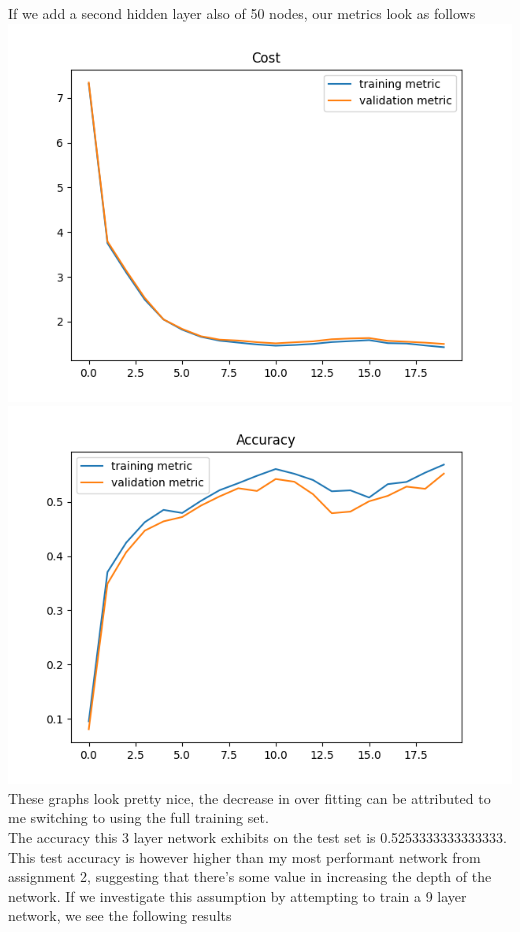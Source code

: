 \documentclass[11pt,a4paper]{article}
\begin{document}
If we add a second hidden layer also of 50 nodes, our metrics look as follows\\
\includegraphics[width=\textwidth]{cost_k=2.png}
\includegraphics[width=\textwidth]{accuracy_k=2.png}
These graphs look pretty nice, the decrease in over fitting can be attributed to me switching to using the full training set.\\


The accuracy this 3 layer network exhibits on the test set is 0.5253333333333333. This test accuracy is however higher than my most performant network from assignment 2, suggesting that there's some value in increasing the depth of the network. If we investigate this assumption by attempting to train a 9 layer network, we see the following results\\
\end{document}
